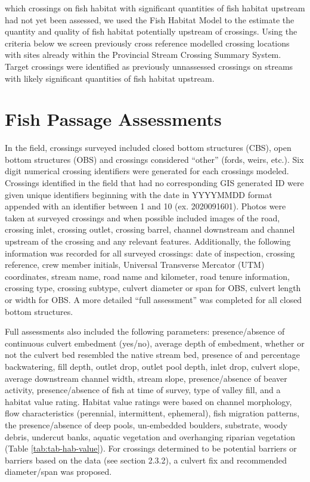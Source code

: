 \documentclass[
]{book}
\begin{document}
which crossings on fish habitat with significant quantities of fish habitat upstream had not yet been assessed, we used the Fish Habitat Model to the estimate the quantity and quality of fish habitat potentially upstream of crossings. Using the criteria below we screen previously cross reference modelled crossing locations with sites already within the Provincial Stream Crossing Summary System. Target crossings were identified as previously unnassessed crossings on streams with likely significant quantities of fish habitat upstream.

\hypertarget{fish-passage-assessments}{%
\section{Fish Passage Assessments}\label{fish-passage-assessments}}

In the field, crossings surveyed included closed bottom structures (CBS), open bottom structures (OBS) and crossings considered ``other'' (fords, weirs, etc.). Six digit numerical crossing identifiers were generated for each crossings modeled. Crossings identified in the field that had no corresponding GIS generated ID were given unique identifiers beginning with the date in YYYYMMDD format appended with an identifier between 1 and 10 (ex. 2020091601). Photos were taken at surveyed crossings and when possible included images of the road, crossing inlet, crossing outlet, crossing barrel, channel downstream and channel upstream of the crossing and any relevant features. Additionally, the following information was recorded for all surveyed crossings: date of inspection, crossing reference, crew member initials, Universal Transverse Mercator (UTM) coordinates, stream name, road name and kilometer, road tenure information, crossing type, crossing subtype, culvert diameter or span for OBS, culvert length or width for OBS. A more detailed ``full assessment'' was completed for all closed bottom structures.

Full assessments also included the following parameters: presence/absence of continuous culvert embedment (yes/no), average depth of embedment, whether or not the culvert bed resembled the native stream bed, presence of and percentage backwatering, fill depth, outlet drop, outlet pool depth, inlet drop, culvert slope, average downstream channel width, stream slope, presence/absence of beaver activity, presence/absence of fish at time of survey, type of valley fill, and a habitat value rating. Habitat value ratings were based on channel morphology, flow characteristics (perennial, intermittent, ephemeral), fish migration patterns, the presence/absence of deep pools, un-embedded boulders, substrate, woody debris, undercut banks, aquatic vegetation and overhanging riparian vegetation (Table \ref{tab:tab-hab-value}). For crossings determined to be potential barriers or barriers based on the data (see section 2.3.2), a culvert fix and recommended diameter/span was proposed.
\end{document}
